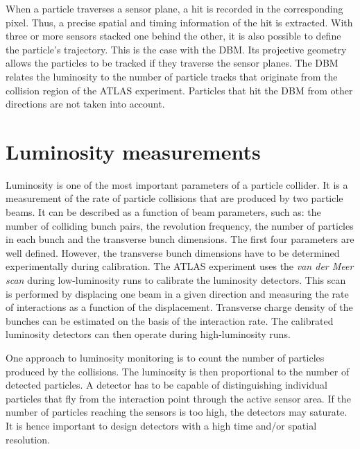 \documentclass[12pt]{packages/mytustyle}  %
\begin{document}
When a particle traverses a sensor plane, a hit is recorded in the corresponding pixel. Thus, a precise spatial and timing information of the hit is extracted. With three or more sensors stacked one behind the other, it is also possible to define the particle's trajectory. This is the case with the DBM. Its projective geometry allows the particles to be tracked if they traverse the sensor planes. The DBM relates the luminosity to the number of particle tracks that originate from the collision region of the ATLAS experiment. Particles that hit the DBM from other directions are not taken into account.


\section{Luminosity measurements}
\label{sec:lummeas}
 \label{sec:lumi}
Luminosity is one of the most important parameters of a particle collider. It is a measurement of the rate of particle collisions that are produced by two particle beams. It can be described as a function of beam parameters, such as: the number of colliding bunch pairs, the revolution frequency, the number of particles in each bunch and the transverse bunch dimensions. The first four parameters are well defined. However, the transverse bunch dimensions have to be determined experimentally during calibration. The ATLAS experiment uses the \emph{van der Meer scan} \cite{} during low-luminosity runs to calibrate the luminosity detectors. This scan is performed by displacing one beam in a given direction and measuring the rate of interactions as a function of the displacement. Transverse charge density of the bunches can be estimated on the basis of the interaction rate. The calibrated luminosity detectors can then operate during high-luminosity runs.

One approach to luminosity monitoring is to count the number of particles produced by the collisions. The luminosity is then proportional to the number of detected particles. A detector has to be capable of distinguishing individual particles that fly from the interaction point through the active sensor area. If the number of particles reaching the sensors is too high, the detectors may saturate. It is hence important to design detectors with a high time and/or spatial resolution.
\end{document}
